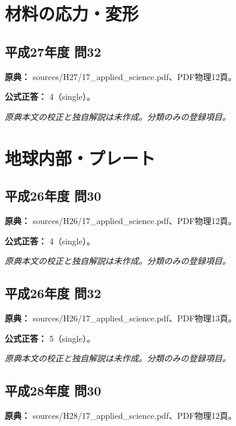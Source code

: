 \section{材料の応力・変形}

\subsection{平成27年度 問32}
\label{q:h27-reg-applied-32}

\noindent\textbf{原典：} sources/H27/17\_applied\_science.pdf、PDF物理12頁。

\textbf{公式正答：} 4（single）。

\par\textit{原典本文の校正と独自解説は未作成。分類のみの登録項目。}

\section{地球内部・プレート}

\subsection{平成26年度 問30}
\label{q:h26-reg-applied-30}

\noindent\textbf{原典：} sources/H26/17\_applied\_science.pdf、PDF物理12頁。

\textbf{公式正答：} 4（single）。

\par\textit{原典本文の校正と独自解説は未作成。分類のみの登録項目。}

\subsection{平成26年度 問32}
\label{q:h26-reg-applied-32}

\noindent\textbf{原典：} sources/H26/17\_applied\_science.pdf、PDF物理13頁。

\textbf{公式正答：} 5（single）。

\par\textit{原典本文の校正と独自解説は未作成。分類のみの登録項目。}

\subsection{平成28年度 問30}
\label{q:h28-reg-applied-30}

\noindent\textbf{原典：} sources/H28/17\_applied\_science.pdf、PDF物理12頁。

